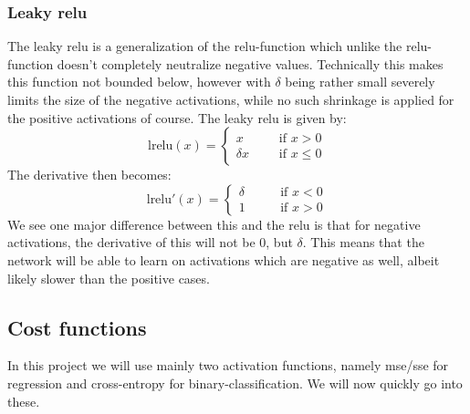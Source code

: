 \documentclass{article}
\begin{document}
\subsubsection{Leaky relu}
The leaky relu is a generalization of the relu-function which unlike the
relu-function doesn't completely neutralize negative values.  Technically this
makes this function not bounded below, however with $\delta$ being rather small
severely limits the size of the negative activations, while no such shrinkage is
applied for the positive activations of course. The leaky relu is given by:
$$\text{lrelu}(x) = \begin{cases}
            x \qquad & \text{if } x > 0    \\
            \delta x & \text{if } x \leq 0
      \end{cases}$$
The derivative then becomes:
$$\text{lrelu}'(x) = \begin{cases}
            \delta \qquad & \text{if } x < 0 \\
            1             & \text{if } x > 0
      \end{cases}$$
We see one major difference between this and the relu is that for negative
activations, the derivative of this will not be $0$, but $\delta$. This means
that the network will be able to learn on activations which are negative as
well, albeit likely slower than the positive cases.

\subsection{Cost functions}
In this project we will use mainly two activation functions, namely mse/sse for
regression and cross-entropy for binary-classification. We will now quickly go
into these.
\end{document}
